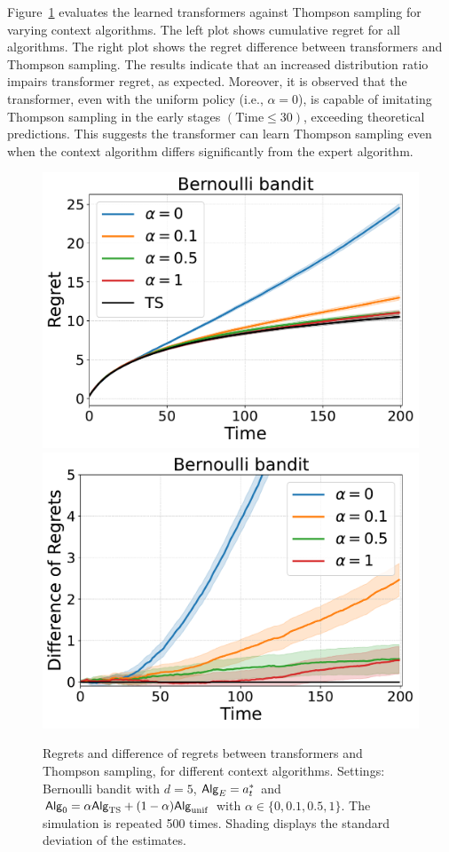 Figure~\ref{fig:compare_ratio} evaluates the learned transformers against Thompson sampling for varying context algorithms.  The left plot shows cumulative regret for all algorithms. The right plot shows the regret difference between transformers and Thompson sampling. The results indicate that an increased distribution ratio impairs transformer regret, as expected. Moreover, it is observed that the transformer, even with the uniform policy (i.e., $\alpha=0$), is capable of imitating Thompson sampling in the early stages $(\mathrm{Time}\leq 30)$, exceeding theoretical predictions. This suggests the transformer can learn Thompson sampling even when the context algorithm differs significantly from the expert algorithm. 




\begin{figure}[ht]
\centering  %
\includegraphics[width=0.45\linewidth]{Sections/figs/record_compare_diff_False.pdf}
\includegraphics[width=0.45\linewidth]{Sections/figs/record_compare_diff_True.pdf}
\caption{Regrets and difference of regrets between transformers and Thompson sampling, for different context algorithms. Settings: Bernoulli bandit with $d=5$, ${\mathsf{Alg}}_{E}={a}_t^*$ and ${\mathsf{Alg}}_0=\alpha{\mathsf{Alg}}_{\mathrm{TS}}+(1-\alpha){\mathsf{Alg}}_{\mathrm{unif}}$ with $\alpha \in \{0,0.1,0.5,1\}$. The simulation is repeated 500 times. Shading displays the standard deviation of the estimates. } 
\label{fig:compare_ratio} 
\end{figure}